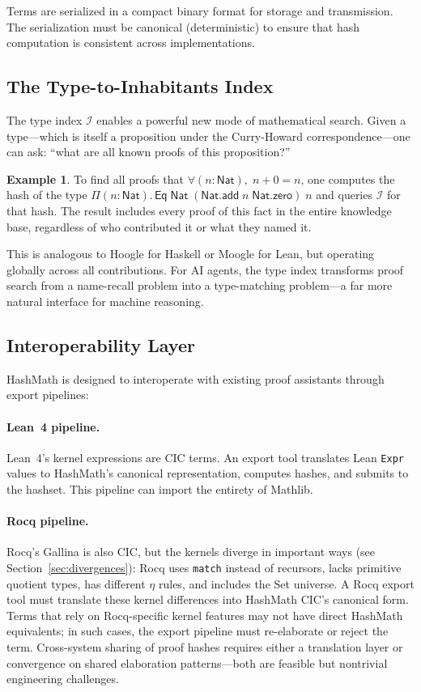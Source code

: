 \documentclass[11pt]{article}
\theoremstyle{definition}
\newtheorem{example}{Example}[section]
\theoremstyle{plain}
\theoremstyle{remark}
\newcommand{\typeindex}{\mathcal{I}}
\newcommand{\Nat}{\textsf{Nat}}
\newcommand{\Eq}{\textsf{Eq}}
\begin{document}
Terms are serialized in a compact binary format for storage and transmission.
The serialization must be canonical (deterministic) to ensure that hash computation is consistent
across implementations.

\subsection{The Type-to-Inhabitants Index}
\label{sec:type-index}

The type index $\typeindex$ enables a powerful new mode of mathematical search.
Given a type---which is itself a proposition under the Curry-Howard correspondence---one can
ask: ``what are all known proofs of this proposition?''

\begin{example}
To find all proofs that $\forall (n : \Nat),\; n + 0 = n$, one computes the hash
of the type $\Pi(n{:}\Nat).\,\Eq\;\Nat\;(\Nat.\textsf{add}\;n\;\Nat.\textsf{zero})\;n$ and queries
$\typeindex$ for that hash.
The result includes every proof of this fact in the entire knowledge base, regardless of who
contributed it or what they named it.
\end{example}

This is analogous to Hoogle for Haskell or Moogle for Lean, but operating globally across
all contributions.
For AI agents, the type index transforms proof search from a name-recall problem into a
type-matching problem---a far more natural interface for machine reasoning.

\subsection{Interoperability Layer}
\label{sec:interop}

HashMath is designed to interoperate with existing proof assistants through export pipelines:

\paragraph{Lean~4 pipeline.}
Lean~4's kernel expressions are CIC terms.
An export tool translates Lean \texttt{Expr} values to HashMath's canonical representation,
computes hashes, and submits to the hashset.
This pipeline can import the entirety of Mathlib.

\paragraph{Rocq pipeline.}
Rocq's Gallina is also CIC, but the kernels diverge in important ways
(see Section~\ref{sec:divergences}): Rocq uses \texttt{match} instead of recursors,
lacks primitive quotient types, has different $\eta$ rules, and includes
the \textsf{Set} universe.
A Rocq export tool must translate these kernel differences into HashMath CIC's
canonical form.
Terms that rely on Rocq-specific kernel features may not have direct HashMath equivalents;
in such cases, the export pipeline must re-elaborate or reject the term.
Cross-system sharing of proof hashes requires either a translation layer or
convergence on shared elaboration patterns---both are feasible but nontrivial
engineering challenges.
\end{document}
